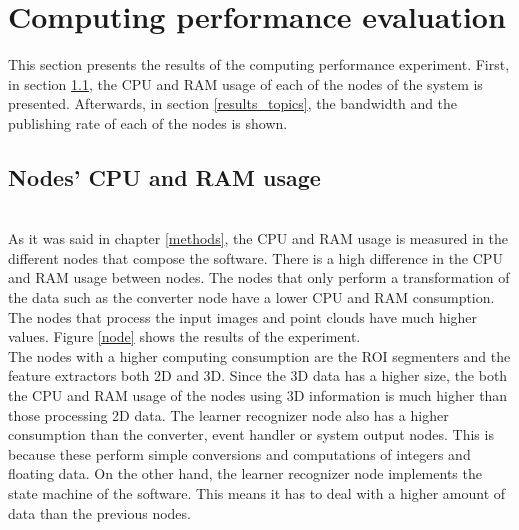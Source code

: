 \section{Computing performance evaluation}
This section presents the results of the computing performance experiment. 
First, in section \ref{results_nodes}, the CPU and RAM usage of each of the nodes of the system is presented. 
Afterwards, in section \ref{results_topics}, the bandwidth and the publishing rate of each of the nodes is shown. 
		\subsection{Nodes' CPU and RAM usage}
		\label{results_nodes}
		\\

			As it was said in chapter \ref{methods}, the CPU and RAM usage is measured in the different nodes that compose the software. 
			There is a high difference in the CPU and RAM usage between nodes.
			The nodes that only perform a transformation of the data such as the converter node have a lower CPU and RAM consumption.
			The nodes that process the input images and point clouds have much higher values. 
			Figure \ref{node} shows the results of the experiment. 
\\

			The nodes with a higher computing consumption are the ROI segmenters and the feature extractors both 2D and 3D. 
			Since the 3D data has a higher size, the both the CPU and RAM usage of the nodes using 3D information is much higher than those processing 2D data. 
			The learner recognizer node also has a higher consumption than the converter, event handler or system output nodes. 
			This is because these perform simple conversions and computations of integers and floating data. 
			On the other hand, the learner recognizer node implements the state machine of the software. 
			This means it has to deal with a higher amount of data than the previous nodes. 
	

